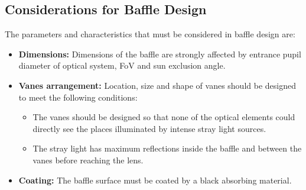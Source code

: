 \subsection{Considerations for Baffle Design}
The parameters and characteristics that must be considered in baffle design are:
\begin{itemize}
    \item \textbf{Dimensions:} Dimensions of the baffle are strongly affected by entrance pupil diameter of optical system, FoV and sun exclusion angle.
    \item \textbf{Vanes arrangement:} Location, size and shape of vanes should be designed to meet the following conditions:
    \begin{itemize}
        \item The vanes should be designed so that none of the optical elements could directly see the places illuminated by intense stray light sources.
        \item The stray light has maximum reflections inside the baffle and between the vanes before reaching the lens.
    \end{itemize}
    \item \textbf{Coating:} The baffle surface must be coated by a black absorbing material.
\end{itemize}

